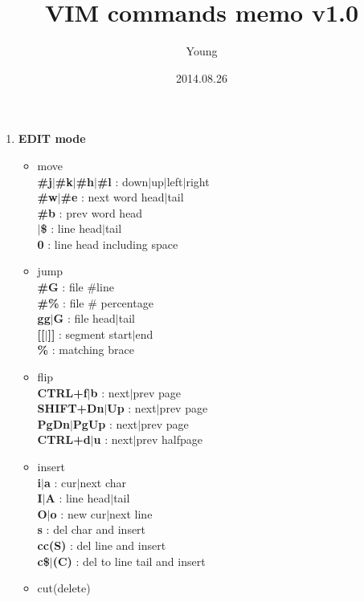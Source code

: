 \documentclass[10pt, a4paper]{article}
\begin{document}
\twocolumn

\pagestyle{empty}
\title{VIM commands memo v1.0}
\author{Young}
\date{2014.08.26}
\maketitle
\thispagestyle{empty} %

\setlength{\baselineskip}{12pt} %

\begin{enumerate}
\item{\textbf{EDIT mode}}
	\begin{itemize}
	\item move \\
	\textbf{\#j{$|$}\#k{$|$}\#h{$|$}\#l} : down{$|$}up{$|$}left{$|$}right \\
	\textbf{\#w{$|$}\#e} : next word head{$|$}tail \\
	\textbf{\#b} : prev word head \\ 
	\textbf{\^{$|$}\$} : line head{$|$}tail \\ 
	\textbf{0} : line head including space
	\item jump \\
	\textbf{\#G} : file \#line \\
	\textbf{\#\%} : file \# percentage \\ 
	\textbf{gg{$|$}G} : file head{$|$}tail \\ 
	\textbf{[[{$|$}]]} : segment start{$|$}end \\
	\textbf{\%} : matching brace
	\item flip \\
	\textbf{CTRL+f{$|$}b} : next{$|$}prev page \\
	\textbf{SHIFT+Dn{$|$}Up} : next{$|$}prev page \\
	\textbf{PgDn{$|$}PgUp} : next{$|$}prev page \\
	\textbf{CTRL+d{$|$}u} : next{$|$}prev halfpage
	\item insert \\
	\textbf{i{$|$}a} : cur{$|$}next char \\
	\textbf{I{$|$}A} : line head{$|$}tail \\
	\textbf{O{$|$}o} : new cur{$|$}next line \\ 
	\textbf{s} : del char and insert \\ 
	\textbf{cc(S)} : del line and insert \\
	\textbf{c\${$|$}(C)} : del to line tail and insert
	\item cut(delete) \\

\end{itemize}
\end{enumerate}
\end{document}
